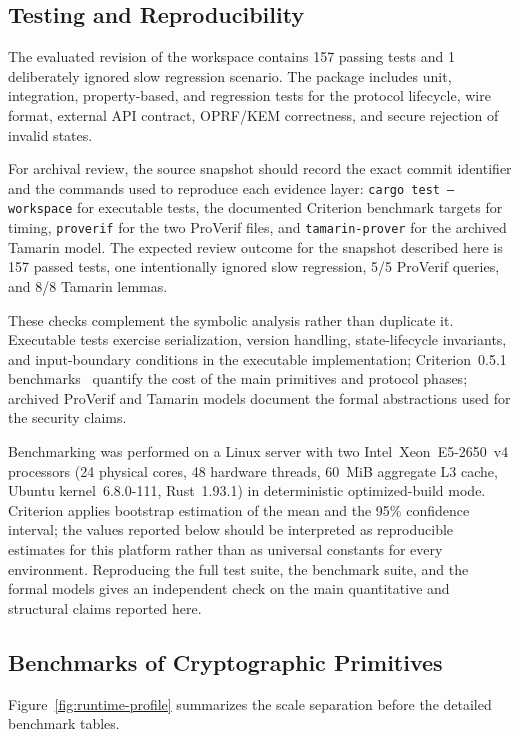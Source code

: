 \documentclass[preprint,12pt]{elsarticle}
\theoremstyle{remark}
\begin{document}
\subsection{Testing and Reproducibility}

The evaluated revision of the workspace contains 157 passing tests and
1 deliberately ignored slow regression scenario. The package includes
unit, integration, property-based, and regression tests for the
protocol lifecycle, wire format, external API contract, OPRF/KEM correctness,
and secure rejection of invalid states.

For archival review, the source snapshot should record the exact commit
identifier and the commands used to reproduce each evidence layer:
\texttt{cargo test --workspace} for executable tests, the documented
Criterion benchmark targets for timing, \texttt{proverif} for the two
ProVerif files, and \texttt{tamarin-prover} for the archived Tamarin
model. The expected review outcome for the snapshot described here is
157 passed tests, one intentionally ignored slow regression, 5/5
ProVerif queries, and 8/8 Tamarin lemmas.

These checks complement the symbolic analysis rather than duplicate it.
Executable tests exercise serialization, version handling, state-lifecycle
invariants, and input-boundary conditions in the executable
implementation; Criterion~0.5.1 benchmarks~\cite{heyer2023} quantify
the cost of the main primitives and protocol phases; archived ProVerif
and Tamarin models document the formal abstractions used for the
security claims.

Benchmarking was performed on a Linux server with two
Intel~Xeon~E5-2650~v4 processors (24 physical cores, 48 hardware
threads, 60~MiB aggregate L3 cache, Ubuntu kernel~6.8.0-111,
Rust~1.93.1) in deterministic optimized-build mode.
Criterion applies bootstrap estimation of the mean and the 95\%
confidence interval; the values reported below should be interpreted
as reproducible estimates for this platform rather than as universal
constants for every environment. Reproducing the full test suite, the
benchmark suite, and the formal models gives an independent check on the
main quantitative and structural claims reported here.

\subsection{Benchmarks of Cryptographic Primitives}

Figure~\ref{fig:runtime-profile} summarizes the scale separation before
the detailed benchmark tables.
\end{document}
